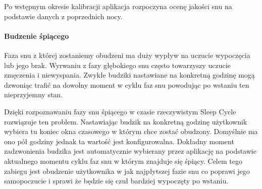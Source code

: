 Po wstępnym okresie kalibracji aplikacja rozpoczyna ocenę jakości snu na podstawie danych z poprzednich nocy.


\paragraph{Budzenie śpiącego}
Faza snu z której zostaniemy obudzeni ma duży wypływ na uczucie wypoczęcia lub jego brak. Wyrwaniu z fazy głębokiego snu często towarzyszy uczucie zmęczenia i niewyspania. Zwykłe budziki nastawiane na konkretną godzinę mogą dzwoniąc trafić na dowolny moment w cyklu faz snu powodując po wstaniu ten nieprzyjemny stan. 

Dzięki rozpoznawaniu fazy snu śpiącego w czasie rzeczywistym Sleep Cycle rozwiązuje ten problem. Nastawiając budzik na konkretną godzinę użytkownik wybiera tu koniec okna czasowego w którym chce zostać obudzony. Domyślnie ma ono pół godziny jednak ta wartość jest konfigurowalna. Dokładny moment zadzwonienia budzika jest automatycznie wybierany przez aplikację na podstawie aktualnego momentu cyklu faz snu w którym znajduje się śpiący. Celem tego zabiegu jest obudzenie użytkownika w jak najpłytszej fazie snu co poprawi jego samopoczucie i sprawi że będzie się czuł bardziej wypoczęty po wstaniu.
